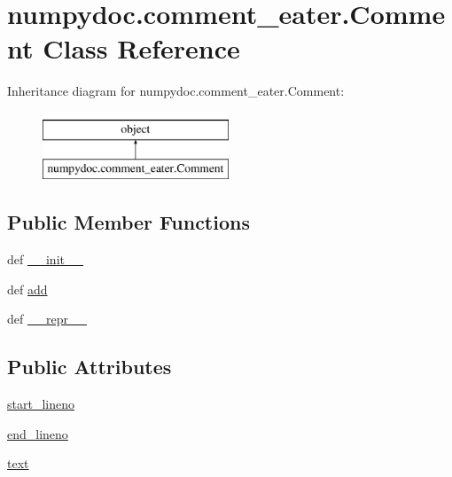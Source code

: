 \hypertarget{classnumpydoc_1_1comment__eater_1_1Comment}{}\section{numpydoc.\+comment\+\_\+eater.\+Comment Class Reference}
\label{classnumpydoc_1_1comment__eater_1_1Comment}
Inheritance diagram for numpydoc.\+comment\+\_\+eater.\+Comment\+:\begin{figure}[H]
\begin{center}
\leavevmode
\includegraphics[height=2.000000cm]{classnumpydoc_1_1comment__eater_1_1Comment}
\end{center}
\end{figure}
\subsection*{Public Member Functions}
\begin{DoxyCompactItemize}
\item 
def \hyperlink{classnumpydoc_1_1comment__eater_1_1Comment_a80b12816ce75b820a10e033392878351}{\+\_\+\+\_\+init\+\_\+\+\_\+}
\item 
def \hyperlink{classnumpydoc_1_1comment__eater_1_1Comment_a55cc5f44004a9f62b6678ec3725ed096}{add}
\item 
def \hyperlink{classnumpydoc_1_1comment__eater_1_1Comment_a07303aa4ac8ad5eeb3cbdb24a0d16722}{\+\_\+\+\_\+repr\+\_\+\+\_\+}
\end{DoxyCompactItemize}
\subsection*{Public Attributes}
\begin{DoxyCompactItemize}
\item 
\hyperlink{classnumpydoc_1_1comment__eater_1_1Comment_a0d9283750442be9dbd8e8d34a75f0f19}{start\+\_\+lineno}
\item 
\hyperlink{classnumpydoc_1_1comment__eater_1_1Comment_a4f207487f7037e258246c4847366ca41}{end\+\_\+lineno}
\item 
\hyperlink{classnumpydoc_1_1comment__eater_1_1Comment_a8efe2991f958dcbd6afba6583ad41a79}{text}
\end{DoxyCompactItemize}
